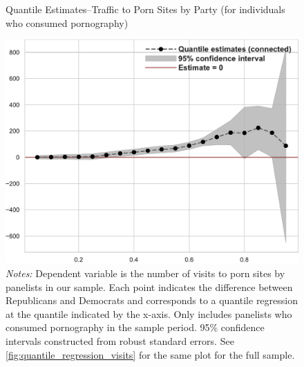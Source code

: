 \documentclass[12pt, letterpaper]{article}
\begin{document}
\begin{figure}
	\centering
	\caption{Quantile Estimates--Traffic to Porn Sites by Party (for individuals who consumed pornography)}
	\includegraphics[width=.55\linewidth]{../figs/quantile_reg_nonzero_visits_adult.pdf}
	\caption*{\footnotesize \emph{Notes:} 
		Dependent variable is the number of visits to porn sites by panelists in our sample.
		Each point indicates the difference between Republicans and Democrats and corresponds to a quantile regression at the quantile indicated by the x-axis.
		Only includes panelists who consumed pornography in the sample period.
		95\% confidence intervals constructed from robust standard errors.
		See \cref{fig:quantile_regression_visits} for the same plot for the full sample.
	}
	\label{fig:quantile_regression_visits_nonzeroes}
\end{figure}
\end{document}
